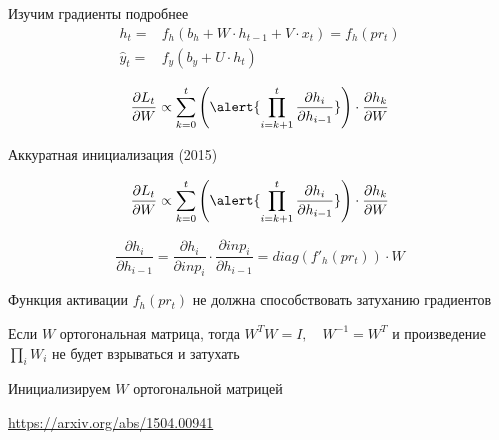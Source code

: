 \documentclass[notes,12pt, aspectratio=169]{beamer}
\newenvironment{wideitemize}{\itemize\addtolength{\itemsep}{10pt}}{\enditemize}
\begin{document}
\begin{frame}{Изучим градиенты подробнее}
	\large
		\begin{equation*} 
			\begin{aligned}
				h_t =& f_h(b_h + W \cdot h_{t-1} + V \cdot x_t) = f_h(pr_t)\\
				\hat{y}_t =& f_y(b_y + U \cdot h_t)
			\end{aligned}
		\end{equation*} 
		
		\par \mbox{} \par
		
		\[\frac{\partial L_t}{\partial W}  \propto \sum_{k=0}^t \left( \alert{\prod_{i=k+1}^t  \frac{\partial h_i}{\partial h_{i-1}}} \right) \cdot  \frac{\partial h_k}{\partial W} \]
		
		\par \mbox{} \par
		

		\par \mbox{} \par
		
\end{frame}



\begin{frame}{Аккуратная инициализация (2015)}
		
		\[\frac{\partial L_t}{\partial W}  \propto \sum_{k=0}^t \left( \alert{\prod_{i=k+1}^t  \frac{\partial h_i}{\partial h_{i-1}}} \right) \cdot  \frac{\partial h_k}{\partial W} \]
				
		\[
		\frac{\partial h_i}{\partial h_{i-1}} = \frac{\partial h_i}{\partial inp_i} \cdot \frac{\partial inp_i}{\partial h_{i-1}} = diag(f'_h(pr_t)) \cdot W
		\]
	
	\begin{wideitemize} 
		\item Функция активации $f_h(pr_t)$ не должна способствовать затуханию градиентов
		
		\item Если $W$ ортогональная матрица, тогда $W^T W = I, \quad W^{-1} = W^T$ и  произведение $\prod_i W_i$ не будет взрываться и затухать %
	
		\item Инициализируем $W$ ортогональной матрицей
	\end{wideitemize} 
	
	\vfill 
	\footnotesize 
	\color{blue} \url{https://arxiv.org/abs/1504.00941} 
\end{frame}
\end{document}
